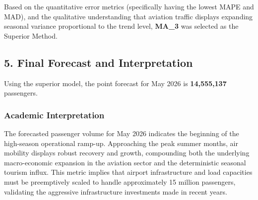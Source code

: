 \documentclass[
]{article}
\begin{document}
Based on the quantitative error metrics (specifically having the lowest
MAPE and MAD), and the qualitative understanding that aviation traffic
displays expanding seasonal variance proportional to the trend level,
\textbf{MA\_3} was selected as the Superior Method.

\subsection{5. Final Forecast and
Interpretation}\label{final-forecast-and-interpretation}

Using the superior model, the point forecast for May 2026 is
\textbf{14,555,137} passengers.

\subsubsection{Academic Interpretation}\label{academic-interpretation}

The forecasted passenger volume for May 2026 indicates the beginning of
the high-season operational ramp-up. Approaching the peak summer months,
air mobility displays robust recovery and growth, compounding both the
underlying macro-economic expansion in the aviation sector and the
deterministic seasonal tourism influx. This metric implies that airport
infrastructure and load capacities must be preemptively scaled to handle
approximately 15 million passengers, validating the aggressive
infrastructure investments made in recent years.
\end{document}
